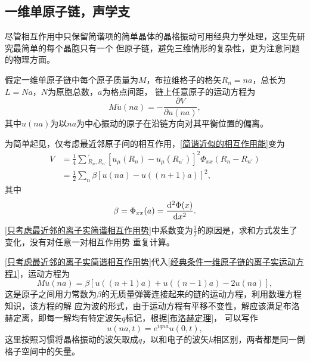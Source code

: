         \subsection{一维单原子链，声学支}
            尽管相互作用中只保留简谐项的简单晶体的晶格振动可用经典力学处理，这里先研究最简单的每个晶胞只有一个
            但原子链，避免三维情形的复杂性，更为注意问题的物理方面。

            假定一维单原子链中每个原子质量为$M$，布拉维格子的格矢$R_n=na$，总长为$L=Na$，$N$为原胞总数，$a$为格点间距，
            链上任意原子的运动方程为
            \begin{equation}
                M\ddot{u}(na)=-\frac{\partial V}{\partial u(na)}\label{经典条件一维原子链的离子实运动方程1},
            \end{equation}
            其中$u(na)$为以$na$为中心振动的原子在沿链方向对其平衡位置的偏离。

            为简单起见，仅考虑最近邻原子间的相互作用，\autoref{简谐近似的相互作用能}变为
            \begin{equation}
                \begin{aligned}
                    V&=\frac{1}{4}\sum{}^{\prime}_{R_n,R_{n^\prime}}[u_\mu(R_n)-u_\mu(R_{n^\prime})]^2\Phi_{xx}(R_n-R_{n'})\\
                    &=\frac{1}{2}\sum_{n}\beta\left[ u(na)-u((n+1)a) \right]^2,
                \end{aligned}\label{只考虑最近邻的离子实简谐相互作用势}
            \end{equation}
            其中
            \begin{equation}
                \beta=\Phi_{xx}(a)=\frac{\mathop{}\!\mathrm{d}^2\Phi(x)}{\mathop{}\!\mathrm{d} x^2}.
            \end{equation}
            \autoref{只考虑最近邻的离子实简谐相互作用势}中系数变为$\frac{1}{2}$的原因是，求和方式发生了变化，没有对任意一对相互作用势
            重复计算。

            \autoref{只考虑最近邻的离子实简谐相互作用势}代入\autoref{经典条件一维原子链的离子实运动方程1}，运动方程为
            \begin{equation}
                M\ddot{u}(na)=\beta\left[ u((n+1)a)+u((n-1)a)-2u(na) \right]\label{经典条件一维原子链的离子实运动方程2},
            \end{equation}
            这是原子之间用力常数为$\beta$的无质量弹簧连接起来的链的运动方程，利用数理方程知识，该方程的解
            应为波的形式，由于运动方程有平移不变性，解应该满足布洛赫定离，即每一解均有特定波矢$q$标记，根据\autoref{布洛赫定理}，
            可以写作
            \begin{equation}
                u(na,t)=e^{iqna}u(0,t)\label{简谐近似下的离子实运动公式},
            \end{equation}
            这里按照习惯将晶格振动的波矢取成$q$，以和电子的波矢$k$相区别，两者都是同一倒格子空间中的矢量。

